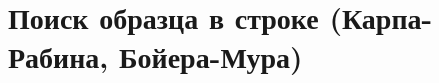 \documentclass[discrete.tex]{subfiles}
\begin{document}
\section{Поиск образца в строке (Карпа-Рабина, Бойера-Мура)}
\end{document}
